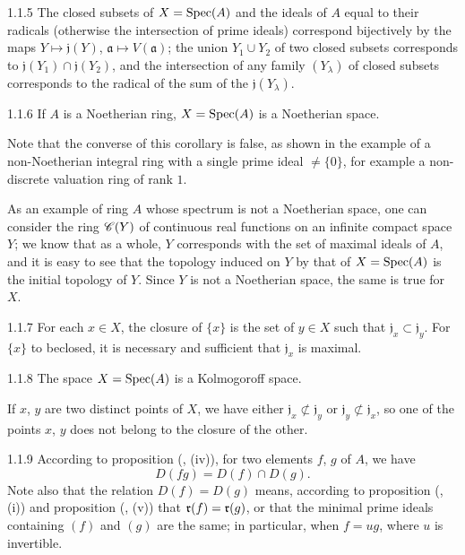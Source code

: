 \documentclass{book}
\begin{document}
\begin{envs}[Corollary]{1.1.5}
\label{cor-1.1.1.5}
The closed subsets of $X={\mathop{\mathrm{Spec}}\nolimits}(A)$ and the ideals of $A$ equal to their radicals (otherwise the
intersection of prime ideals) correspond bijectively by the  maps $Y\mapsto\mathfrak{j}(Y)$,
$\mathfrak{a}\mapsto V(\mathfrak{a})$; the union $Y_1\cup Y_2$ of two closed subsets corresponds to
$\mathfrak{j}(Y_1)\cap\mathfrak{j}(Y_2)$, and the intersection of any family $(Y_\lambda)$ of closed subsets
corresponds to the radical of the sum of the $\mathfrak{j}(Y_\lambda)$.
\end{envs}

\begin{envs}[Corollary]{1.1.6}
\label{cor-1.1.1.6}
If $A$ is a Noetherian ring, $X={\mathop{\mathrm{Spec}}\nolimits}(A)$ is a Noetherian space.
\end{envs}
Note that the converse of this corollary is false, as shown
in the example of a non-Noetherian integral ring with a single prime ideal $\neq\{0\}$, for
example a non-discrete valuation ring of rank $1$.

As an example of ring $A$ whose spectrum is not a Noetherian space, one
can consider the ring $\mathscr{C}(Y)$ of continuous real functions on an infinite compact space
$Y$; we know that as a whole, $Y$ corresponds with the set of maximal ideals
of $A$, and it is easy to see that the topology induced on $Y$ by that of $X={\mathop{\mathrm{Spec}}\nolimits}(A)$
is the initial topology of $Y$. Since $Y$ is not a Noetherian space, the same is true for $X$.

\begin{envs}[Corollary]{1.1.7}
\label{cor-1.1.1.7}
For each $x\in X$, the closure of $\{x\}$ is the set of $y\in X$ such that $\mathfrak{j}_x\subset\mathfrak{j}_y$.
For $\{x\}$ to beclosed, it is necessary and sufficient that $\mathfrak{j}_x$ is maximal.
\end{envs}

\begin{envs}[Corollary]{1.1.8}
\label{cor-1.1.1.8}
The space $X={\mathop{\mathrm{Spec}}\nolimits}(A)$ is a Kolmogoroff space.
\end{envs}

If $x$, $y$ are two distinct points of $X$, we have either $\mathfrak{j}_x\not\subset\mathfrak{j}_y$ or
$\mathfrak{j}_y\not\subset\mathfrak{j}_x$, so one of the points $x$, $y$ does not belong to the closure of the other.

\begin{env}{1.1.9}
\label{env-1.1.1.9}
According to proposition (, (iv)), for two elements $f$, $g$ of $A$, we have
\[
  D(fg)=D(f)\cap D(g).\tag{1.1.9.1}
\]
Note also that the relation $D(f)=D(g)$ means, according to proposition (, (i))
and proposition (, (v)) that $\mathfrak{r}(f)=\mathfrak{r}(g)$, or that the minimal prime ideals
containing $(f)$ and $(g)$ are the same; in particular, when $f=ug$, where $u$ is invertible.
\end{env}
\end{document}
